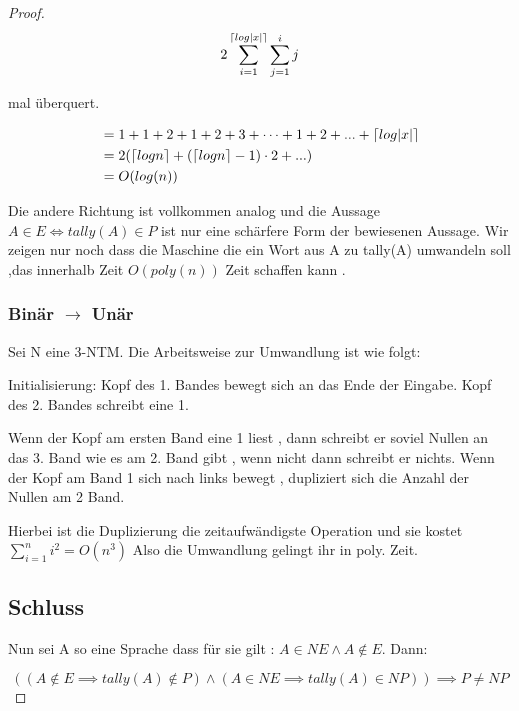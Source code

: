\documentclass{article}
\def\mathify#1{\ifmmode{#1}\else\mbox{$#1$}\fi} %
\newcommand{\ceil}[1]{\mathify{\left\lceil {#1}\right\rceil}}
\begin{document}
\begin{proof}
\[ 2 \sum_{i=1}^{\ceil{log |x|}} \sum_{j=1}^{i} j \] 

mal überquert.

\begin{align*}
&=1 + 1+ 2 + 1 + 2 + 3 + \dots + 1 + 2 + ... + \ceil{log |x|}\\
&=2( \ceil{log n} + (\ceil{log n} -1) \cdot 2 + ... )\\
&=O(log(n))\\
\end{align*}


Die andere Richtung ist vollkommen analog und die Aussage $A \in E \Leftrightarrow tally(A) \in P$ ist nur eine schärfere Form der bewiesenen Aussage. Wir zeigen nur noch dass die Maschine die ein Wort aus A zu tally(A) umwandeln soll ,das innerhalb Zeit $O(poly(n))$ Zeit schaffen  kann .


\subsubsection*{Binär $\rightarrow$ Unär}
Sei N eine 3-NTM. Die Arbeitsweise zur Umwandlung ist wie folgt:

Initialisierung:
Kopf des 1. Bandes bewegt sich an das Ende der Eingabe.
Kopf des 2. Bandes schreibt eine 1.

Wenn der Kopf am ersten Band eine 1 liest , dann schreibt er soviel Nullen an das 3. Band wie es am 2. Band gibt , wenn nicht dann schreibt er nichts.
Wenn der Kopf am Band 1 sich nach links bewegt , dupliziert sich die Anzahl der Nullen am 2 Band.

Hierbei ist die Duplizierung die zeitaufwändigste Operation und sie kostet $\sum_{i=1}^{n}  i^2 = O(n^3)$ Also die Umwandlung gelingt ihr in poly. Zeit.

\subsection*{Schluss}
Nun sei A so eine Sprache dass für sie gilt : $A \in NE  \land  A\notin  E$. Dann:

\[ ( (A \notin E \implies tally(A) \notin P) \land (A \in NE \implies tally(A) \in NP) ) \implies P \neq NP \] 


\end{proof}
\end{document}
